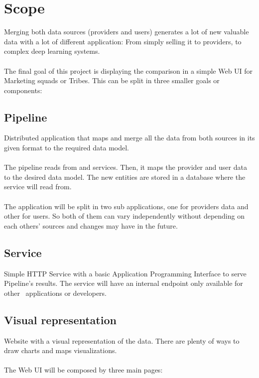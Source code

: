 
\section{Scope}

Merging both data sources (providers and users) generates a lot of new valuable data with a lot of different application: From simply selling it to providers, to complex deep learning systems.
\\\\
The final goal of this project is displaying the comparison in a simple Web UI for Marketing squads or Tribes. This can be split in three smaller goals or components:

\subsection{Pipeline}

Distributed application that maps and merge all the data from both sources in its given format to the required data model.
\\\\
The pipeline reads from  and  services. Then, it maps the provider and user data to the desired data model. The new entities are stored in a database where the service will read from.
\\\\
The application will be split in two sub applications, one for providers data and other for users. So both of them can vary independently without depending on each others' sources and changes may have in the future.

\subsection{Service}

Simple HTTP Service with a basic Application Programming Interface to serve Pipeline's results. The service will have an internal endpoint only available for other \company\ applications or developers.

\subsection{Visual representation} \label{visual_representation}

Website with a visual representation of the data. There are plenty of ways to draw charts and maps visualizations.
\\\\
The Web UI will be composed by three main pages:

